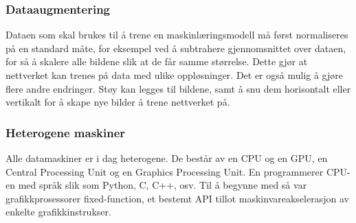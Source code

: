 \subsubsection{Dataaugmentering}

Dataen som skal brukes til å trene en maskinlæringsmodell må først normaliseres på en standard måte, for eksempel ved å subtrahere gjennomsnittet over dataen, for så å skalere alle bildene slik at de får samme størrelse. Dette gjør at nettverket kan trenes på data med ulike oppløsninger. Det er også mulig å gjøre flere andre endringer. Støy kan legges til bildene, samt å snu dem horisontalt eller vertikalt for å skape nye bilder å trene nettverket på. \cite{Cadieu m.fl. 2014 s. 15}

\subsubsection{Heterogene maskiner}


Alle datamaskiner er i dag heterogene. De består av en CPU og en GPU, en Central Processing Unit og en Graphics Processing Unit. En programmerer CPU-en med språk slik som Python, C, C++, osv. Til å begynne med så var grafikkprosessorer fixed-function, et bestemt API tillot maskinvareakselerasjon av enkelte grafikkinstrukser. \cite{Buck 2006 s. 5}

